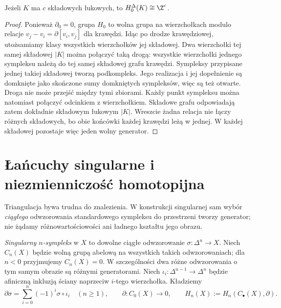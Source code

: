 \begin{stwierdzenie}[Składowe i $H_0$]
\label{prop:h0-symplicjalne}
Jeżeli $K$ ma $c$ składowych łukowych,
to $H_0^\Delta(K)\cong\Z^c$.
\end{stwierdzenie}
\begin{proof}
Ponieważ $\partial_0=0$, grupa $H_0$
to wolna grupa na wierzchołkach
modulo relacje
$v_j-v_i=\partial[v_i,v_j]$
dla krawędzi. Idąc po drodze krawędziowej,
utożsamiamy klasy wszystkich wierzchołków
jej składowej. Dwa wierzchołki tej samej
składowej $|K|$ można połączyć taką drogą:
wszystkie wierzchołki jednego sympleksu należą do tej samej
składowej grafu krawędzi. Sympleksy przypisane jednej takiej
składowej tworzą podkompleks. Jego realizacja i jej dopełnienie
są domknięte jako skończone sumy domkniętych sympleksów,
więc są też otwarte. Droga nie może przejść między tymi zbiorami.
Każdy punkt sympleksu można natomiast połączyć odcinkiem z wierzchołkiem.
Składowe grafu odpowiadają zatem dokładnie składowym łukowym $|K|$. Wreszcie żadna
relacja nie łączy różnych składowych,
bo obie końcówki każdej krawędzi leżą
w jednej. W każdej składowej pozostaje
więc jeden wolny generator.
\end{proof}

\section{Łańcuchy singularne i niezmienniczość homotopijna}
\label{sec:homologia-singularna}

Triangulacja bywa trudna do znalezienia. W konstrukcji
singularnej sam wybór \emph{ciągłego} odwzorowania
standardowego sympleksu do przestrzeni tworzy
generator; nie żądamy różnowartościowości ani
ładnego kształtu jego obrazu.

\begin{definicja}
\label{def:homologia-singularna}
\emph{Singularny $n$-sympleks} w $X$ to dowolne
ciągłe odwzorowanie $\sigma:\Delta^n\to X$.
Niech $C_n(X)$ będzie wolną grupą abelową
na wszystkich takich odwzorowaniach; dla $n<0$ przyjmujemy $C_n(X)=0$.
W szczególności
dwa różne odwzorowania o tym samym obrazie są
różnymi generatorami. Niech
$\iota_i:\Delta^{n-1}\to\Delta^n$
będzie afiniczną inkluzją ściany
naprzeciw $i$-tego wierzchołka. Kładziemy
\begin{equation}\label{eq:singular-boundary}
 \partial\sigma=\sum_{i=0}^n(-1)^i
 \sigma\circ\iota_i\quad(n\geq1),
 \qquad \partial:C_0(X)\to0,
 \qquad H_n(X):=H_n(C_\bullet(X),\partial).
\end{equation}
\end{definicja}

